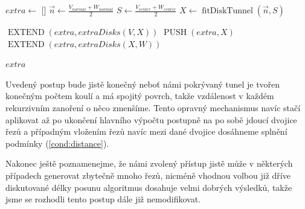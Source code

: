 \begin{algorithmic}[1]
\label{alg:extraDisks}

    \State $extra \gets $ []
        \State $ \vec{n} \gets \frac{V_{normal} + W_{normal}}{2} $
        \State $ S \gets \frac{V_{center} + W_{center}}{2} $
        \State $ X \gets \operatorname{fitDiskTunnel}(\vec{n}, S) $
        \Statex

        \State $ \operatorname{EXTEND}(extra, extraDisks(V, X)) $
        \State $ \operatorname{PUSH}(extra, X) $
        \State $ \operatorname{EXTEND}(extra, extraDisks(X, W)) $
    \EndIf

    \State \Return $ extra $
\EndFunction

\end{algorithmic}

Uvedený postup bude jistě konečný neboť námi pokrývaný tunel je tvořen konečným
počtem koulí a má spojitý povrch, takže vzdálenost v každém rekurzivním zanoření
o něco zmenšíme. Tento opravný mechanismus navíc stačí aplikovat až po ukončení
hlavního výpočtu postupně na po sobě jdoucí dvojice řezů a případným vložením
řezů navíc mezi dané dvojice dosáhneme splnění podmínky (\ref{cond:distance}).

Nakonec ještě poznamenejme, že námi zvolený přístup jistě může v některých případech
generovat zbytečně mnoho řezů, nicméně vhodnou volbou již dříve
diskutované délky posunu algoritmus dosahuje velmi dobrých výsledků, takže
jsme se rozhodli tento postup dále již nemodifikovat.
